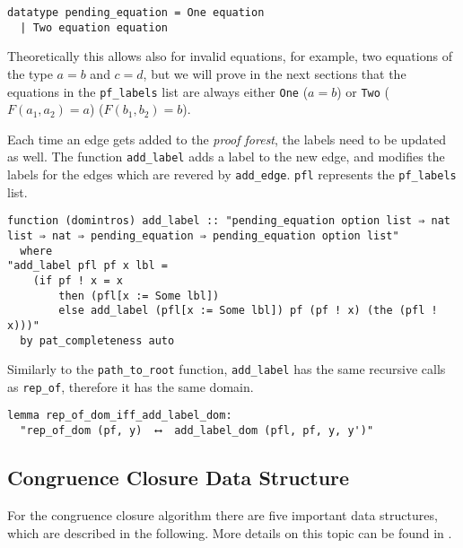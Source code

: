 \begin{lstlisting}
datatype pending_equation = One equation
  | Two equation equation
\end{lstlisting}

Theoretically this allows also for invalid equations, for example, two equations of the type $a = b$ and $c = d$, but we will prove in the next sections that the equations in the \lstinline|pf_labels| list are always either \lstinline{One} ($a = b$) or \lstinline{Two} ($F(a_1, a_2) = a$) ($F(b_1, b_2) = b$).

Each time an edge gets added to the \emph{proof forest}, the labels need to be updated as well. The function \lstinline{add_label} adds a label to the new edge, and modifies the labels for the edges which are revered by \lstinline{add_edge}. \lstinline|pfl| represents the \lstinline|pf_labels| list.

\begin{lstlisting}
function (domintros) add_label :: "pending_equation option list ⇒ nat list ⇒ nat ⇒ pending_equation ⇒ pending_equation option list"
  where
"add_label pfl pf x lbl =
    (if pf ! x = x
        then (pfl[x := Some lbl])
        else add_label (pfl[x := Some lbl]) pf (pf ! x) (the (pfl ! x)))"
  by pat_completeness auto
\end{lstlisting}

Similarly to the \lstinline{path_to_root} function, \lstinline{add_label} has the same recursive calls as \lstinline{rep_of}, therefore it has the same domain.

\begin{lstlisting}
lemma rep_of_dom_iff_add_label_dom:
  "rep_of_dom (pf, y)  ⟷  add_label_dom (pfl, pf, y, y')"
\end{lstlisting}

\subsection{Congruence Closure Data Structure}
\label{subsection:datastructure}

For the congruence closure algorithm there are five important data structures, which are described in the following. More details on this topic can be found in \cite{Nieuwenhuis}.

